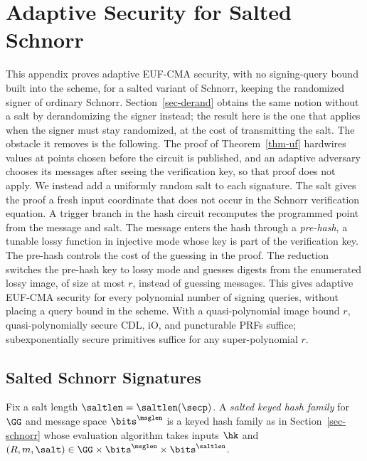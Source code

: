 \section{Adaptive Security for Salted Schnorr} \label{sec-adaptive}

This appendix proves adaptive EUF-CMA security, with no signing-query bound built into the scheme, for a salted variant of Schnorr, keeping the randomized signer of ordinary Schnorr. Section~\ref{sec-derand} obtains the same notion without a salt by derandomizing the signer instead; the result here is the one that applies when the signer must stay randomized, at the cost of transmitting the salt. The obstacle it removes is the following. The proof of Theorem~\ref{thm-uf} hardwires values at points chosen before the circuit is published, and an adaptive adversary chooses its messages after seeing the verification key, so that proof does not apply. We instead add a uniformly random salt to each signature. The salt gives the proof a fresh input coordinate that does not occur in the Schnorr verification equation. A trigger branch in the hash circuit recomputes the programmed point from the message and salt. The message enters the hash through a \emph{pre-hash}, a tunable lossy function in injective mode whose key is part of the verification key. The pre-hash controls the cost of the guessing in the proof. The reduction switches the pre-hash key to lossy mode and guesses digests from the enumerated lossy image, of size at most $r$, instead of guessing messages. This gives adaptive EUF-CMA security for every polynomial number of signing queries, without placing a query bound in the scheme. With a quasi-polynomial image bound $r$, quasi-polynomially secure CDL, iO, and puncturable PRFs suffice; subexponentially secure primitives suffice for any super-polynomial $r$.

\subsection{Salted Schnorr Signatures} \label{sec-salted}

Fix a salt length $\saltlen = \saltlen(\secp)$. A \emph{salted keyed hash family} for $\GG$ and message space $\bits^{\msglen}$ is a keyed hash family as in Section~\ref{sec-schnorr} whose evaluation algorithm takes inputs $\hk$ and $(R, m, \salt) \in \GG \times \bits^{\msglen} \times \bits^{\saltlen}$.

